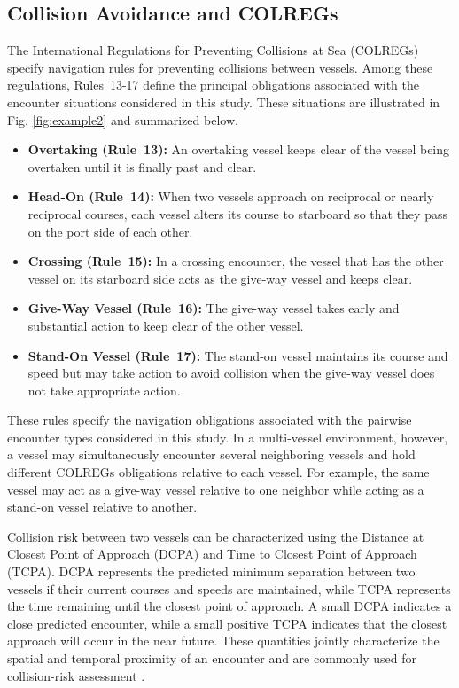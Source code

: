 \documentclass[final,5p,times,twocolumn]{elsarticle}
\begin{document}
\subsection{Collision Avoidance and COLREGs}
{\color{violet}
The International Regulations for Preventing Collisions at Sea (COLREGs) specify navigation rules for preventing collisions between vessels.
Among these regulations, Rules~13-17 define the principal obligations associated with the encounter situations considered in this study.
These situations are illustrated in Fig. \ref{fig:example2} and summarized below.
\begin{itemize}
    \item \textbf{Overtaking (Rule~13):}
    An overtaking vessel keeps clear of the vessel being overtaken until
    it is finally past and clear.

    \item \textbf{Head-On (Rule~14):}
    When two vessels approach on reciprocal or nearly reciprocal courses,
    each vessel alters its course to starboard so that they pass on the
    port side of each other.

    \item \textbf{Crossing (Rule~15):}
    In a crossing encounter, the vessel that has the other vessel on its
    starboard side acts as the give-way vessel and keeps clear.

    \item \textbf{Give-Way Vessel (Rule~16):}
    The give-way vessel takes early and substantial action to keep clear
    of the other vessel.

    \item \textbf{Stand-On Vessel (Rule~17):}
    The stand-on vessel maintains its course and speed but may take
    action to avoid collision when the give-way vessel does not take
    appropriate action.
\end{itemize}

These rules specify the navigation obligations associated with the
pairwise encounter types considered in this study. In a multi-vessel
environment, however, a vessel may simultaneously encounter several
neighboring vessels and hold different COLREGs obligations relative to
each vessel. For example, the same vessel may act as a give-way vessel
relative to one neighbor while acting as a stand-on vessel relative to
another.

Collision risk between two vessels can be characterized using the
Distance at Closest Point of Approach (DCPA) and Time to Closest Point
of Approach (TCPA). DCPA represents the predicted minimum separation
between two vessels if their current courses and speeds are maintained,
while TCPA represents the time remaining until the closest point of
approach. A small DCPA indicates a close predicted encounter, while a
small positive TCPA indicates that the closest approach will occur in
the near future. These quantities jointly characterize the spatial and
temporal proximity of an encounter and are commonly used for
collision-risk assessment \citep{Zhao-COLREGs}.

}
\end{document}

